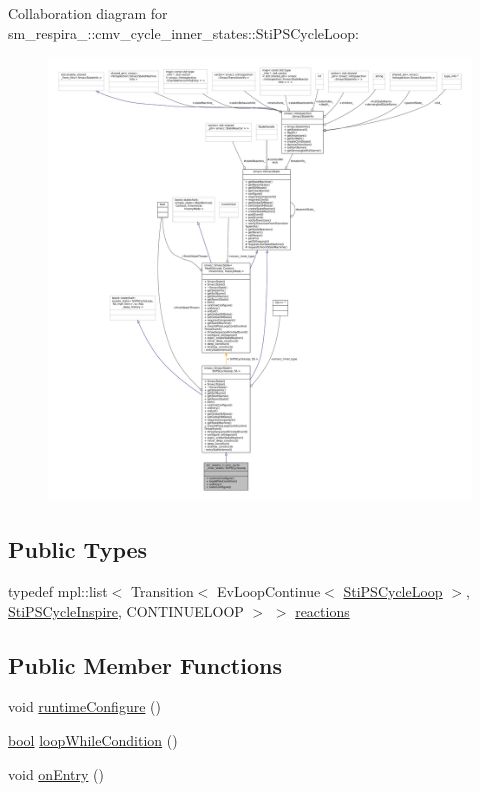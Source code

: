 Collaboration diagram for sm\+\_\+respira\+\_\+:\+:cmv\+\_\+cycle\+\_\+inner\+\_\+states\+:\+:Sti\+P\+S\+Cycle\+Loop\+:
\nopagebreak
\begin{figure}[H]
\begin{center}
\leavevmode
\includegraphics[width=350pt]{structsm__respira__1_1_1cmv__cycle__inner__states_1_1StiPSCycleLoop__coll__graph}
\end{center}
\end{figure}
\subsection*{Public Types}
\begin{DoxyCompactItemize}
\item 
typedef mpl\+::list$<$ Transition$<$ Ev\+Loop\+Continue$<$ \hyperlink{structsm__respira__1_1_1cmv__cycle__inner__states_1_1StiPSCycleLoop}{Sti\+P\+S\+Cycle\+Loop} $>$, \hyperlink{structsm__respira__1_1_1cmv__cycle__inner__states_1_1StiPSCycleInspire}{Sti\+P\+S\+Cycle\+Inspire}, C\+O\+N\+T\+I\+N\+U\+E\+L\+O\+OP $>$ $>$ \hyperlink{structsm__respira__1_1_1cmv__cycle__inner__states_1_1StiPSCycleLoop_a052fbb8e2512f8508670de09483cead5}{reactions}
\end{DoxyCompactItemize}
\subsection*{Public Member Functions}
\begin{DoxyCompactItemize}
\item 
void \hyperlink{structsm__respira__1_1_1cmv__cycle__inner__states_1_1StiPSCycleLoop_a0f5907ad97cc0722381330acaa7f78f5}{runtime\+Configure} ()
\item 
\hyperlink{classbool}{bool} \hyperlink{structsm__respira__1_1_1cmv__cycle__inner__states_1_1StiPSCycleLoop_a0dbaf83715bbaca237b49d7739b7a993}{loop\+While\+Condition} ()
\item 
void \hyperlink{structsm__respira__1_1_1cmv__cycle__inner__states_1_1StiPSCycleLoop_aecd37369448382fa73cf481f58acc9fc}{on\+Entry} ()
\end{DoxyCompactItemize}
